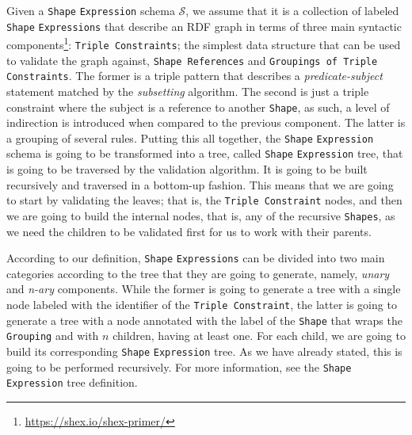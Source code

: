 Given a \texttt{Shape} \texttt{Expression} schema $\mathcal{S}$, we assume that it is a collection of labeled \texttt{Shape} \texttt{Expressions} that describe an RDF graph in terms of three main syntactic components\footnote{\url{https://shex.io/shex-primer/}}: \texttt{Triple Constraints}; the simplest data structure that can be used to validate the graph against, \texttt{Shape References} and \texttt{Groupings of Triple Constraints}. The former is a triple pattern that describes a \textit{predicate-subject} statement matched by the \textit{subsetting} algorithm. The second is just a triple constraint where the subject is a reference to another \texttt{Shape}, as such, a level of indirection is introduced when compared to the previous component. The latter is a grouping of several rules. Putting this all together, the \texttt{Shape} \texttt{Expression} schema is going to be transformed into a tree, called \texttt{Shape} \texttt{Expression} tree, that is going to be traversed by the validation algorithm. It is going to be built recursively and traversed in a bottom-up fashion. This means that we are going to start by validating the leaves; that is, the \texttt{Triple Constraint} nodes, and then we are going to build the internal nodes, that is, any of the recursive \texttt{Shapes}, as we need the children to be validated first for us to work with their parents.

According to our definition, \texttt{Shape} \texttt{Expressions} can be divided into two main categories according to the tree that they are going to generate, namely, \textit{unary} and \textit{n-ary} components. While the former is going to generate a tree with a single node labeled with the identifier of the \texttt{Triple Constraint}, the latter is going to generate a tree with a node annotated with the label of the \texttt{Shape} that wraps the \texttt{Grouping} and with $n$ children, having at least one. For each child, we are going to build its corresponding \texttt{Shape} \texttt{Expression} tree. As we have already stated, this is going to be performed recursively. For more information, see the \texttt{Shape} \texttt{Expression} tree definition.

